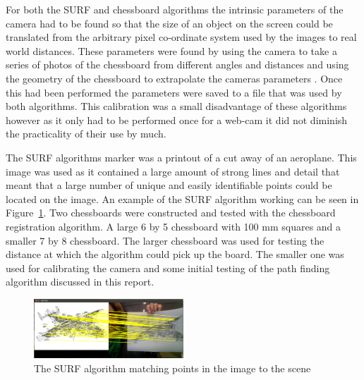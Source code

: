 For both the SURF and chessboard algorithms the intrinsic parameters of the camera had to be found so that the size of an object on the screen could be translated from the arbitrary pixel co-ordinate system used by the images to real world distances. These parameters were found by using the camera to take a series of photos of the chessboard from different angles and distances and using the geometry of the chessboard to extrapolate the cameras parameters \cite{cali}. Once this had been performed the parameters were saved to a file that was used by both algorithms. This calibration was a small disadvantage of these algorithms however as it only had to be performed once for a web-cam it did not diminish the practicality of their use by much.

The SURF algorithms marker was a printout of a cut away of an aeroplane. This image was used as it contained a large amount of strong lines and detail that meant that a large number of unique and easily identifiable points could be located on the image. An example of the SURF algorithm working can be seen in Figure~\ref{plane}. Two chessboards were constructed and tested with the chessboard registration algorithm. A large 6 by 5 chessboard with 100 mm squares and a smaller 7 by 8 chessboard. The larger chessboard was used for testing the distance at which the algorithm could pick up the board. The smaller one was used for calibrating the camera and some initial testing of the path finding algorithm discussed in this report. 

\begin{figure}[ht]
	\begin{center}
		\includegraphics[width=0.5\textwidth]{surf_match}
	\end{center}
	\caption{The SURF algorithm matching points in the image to the scene}
	\label{plane}
\end{figure}